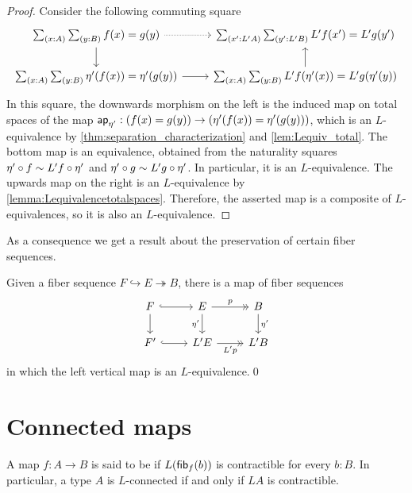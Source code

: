 \begin{proof}
Consider the following commuting square
\begin{equation*}
\begin{tikzcd}
\sm{x:A}{y:B}f(x)=g(y) \arrow[r,densely dotted] \arrow[d] & \sm{x':L'A}{y':L'B} L'f(x')=L'g(y') \\
\sm{x:A}{y:B}\eta'(f(x))=\eta'(g(y)) \arrow[r] & \sm{x:A}{y:B}L'f(\eta'(x))=L'g(\eta'(y)) \arrow[u]
\end{tikzcd}
\end{equation*}
In this square, the downwards morphism on the left is the induced map on total spaces of the map $\mathsf{ap}_{\eta'}:(f(x)=g(y))\to (\eta'(f(x))=\eta'(g(y)))$, which is an $L$-equivalence by \cref{thm:separation_characterization} and \cref{lem:Lequiv_total}. The bottom map is an equivalence, obtained from the naturality squares $\eta'\circ f\sim L'f\circ \eta'$ and $\eta'\circ g\sim L'g\circ \eta'$. In particular, it is an $L$-equivalence. The upwards map on the right is an $L$-equivalence by \cref{lemma:Lequivalencetotalspaces}. Therefore, the asserted map is a composite of $L$-equivalences, so it is also an $L$-equivalence.
\end{proof}

As a consequence we get a result about the preservation of certain fiber sequences.

\begin{cor}\label{corollary:preservationfibersequences2}
    Given a fiber sequence $F \hookrightarrow E \twoheadrightarrow B$, there is a map of fiber sequences
\begin{equation*}
\begin{tikzcd}
F \arrow[r,hookrightarrow] \arrow[d] & E \arrow[r,->>,"p"] \arrow[d,swap,"\eta'"] & B \arrow[d,"\eta'"] \\
F' \arrow[r,hookrightarrow] & L'E \arrow[r,->>,swap,"L'p"] & L'B
\end{tikzcd}
\end{equation*}
    in which the left vertical map is an $L$-equivalence.\qed
\end{cor}

\section{Connected maps}
\label{sec:connected-maps}

\begin{defn}
A map $f:A\to B$ is said to be  if $L(\mathsf{fib}_{f}(b))$ is contractible for every $b:B$. In particular, a type $A$ is $L$-connected if and only if $LA$ is contractible.
\end{defn}


